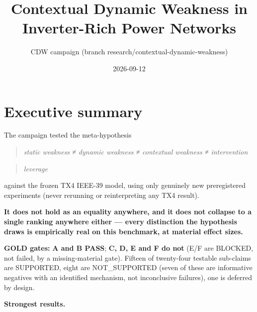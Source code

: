 \documentclass[10pt,a4paper]{article}
\title{Contextual Dynamic Weakness in Inverter-Rich Power Networks}
\date{2026-09-12}
\author{CDW campaign (branch research/contextual-dynamic-weakness)}
\begin{document}
\maketitle
\tableofcontents
\newpage
\section{Executive summary}
The campaign tested the meta-hypothesis

\begin{quote}\itshape static weakness ≠ dynamic weakness ≠ contextual weakness ≠ intervention\end{quote}
\begin{quote}\itshape leverage\end{quote}
against the frozen TX4 IEEE-39 model, using only genuinely new preregistered experiments (never rerunning or reinterpreting any TX4 result).

\textbf{It does not hold as an equality anywhere, and it does not collapse to a single ranking anywhere either — every distinction the hypothesis draws is empirically real on this benchmark, at material effect sizes.}

\textbf{GOLD gates:} \textbf{A and B PASS}; \textbf{C, D, E and F do not} (E/F are BLOCKED, not failed, by a missing-material gate). Fifteen of twenty-four testable sub-claims are SUPPORTED, eight are NOT\_SUPPORTED (seven of these are informative negatives with an identified mechanism, not inconclusive failures), one is deferred by design.

\textbf{Strongest results.}
\end{document}
